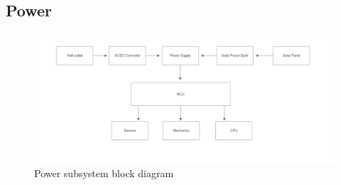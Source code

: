 \subsection{Power}
\begin{figure}[H]
    \centering
    \caption{Power subsystem block diagram}
    \includegraphics{block-diagrams/images/PowerSystemBlock.png}
\end{figure}